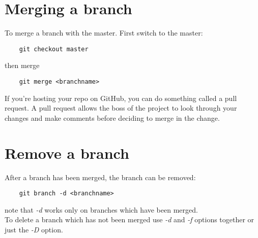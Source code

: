 \documentclass[10pt,letterpaper]{book}
\begin{document}
\section{Merging a branch}
To merge a branch with the master. First switch to the master:
\begin{lstlisting}
	git checkout master
\end{lstlisting}
then merge
\begin{lstlisting}
	git merge <branchname>
\end{lstlisting}
If you're hosting your repo on GitHub, you can do something called a pull request. A pull request allows the boss of the project to look through your changes and make comments before deciding to merge in the change.

\section{Remove a branch}
After a branch has been merged, the branch can be removed:
\begin{lstlisting}
	git branch -d <branchname>
\end{lstlisting}
note that \textit{-d} works only on branches which have been merged.\\
To delete a branch which has not been merged use \textit{-d} and \textit{-f} options together or just the \textit{-D} option.
\end{document}
